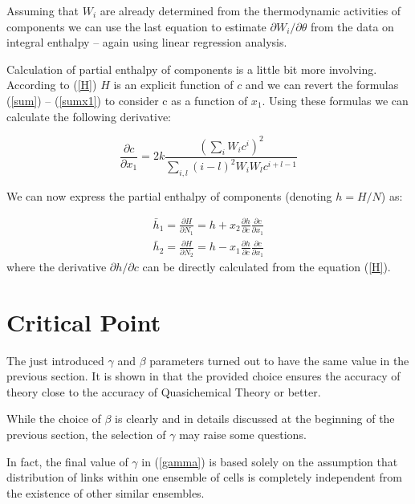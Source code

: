 \documentclass[12pt,abstract]{scrartcl}
\begin{document}
Assuming that $W_i$ are already determined from the thermodynamic activities of components we can use the last equation to estimate $\partial W_i / \partial \theta$ from the data on integral  enthalpy -- again using linear regression analysis.

Calculation of partial  enthalpy of components is a little bit more involving. According to (\ref{H}) $H$ is an explicit function of $c$ and we can revert the formulas (\ref{sum}) --  (\ref{sumx1}) to consider c as a function of $x_1$. Using these formulas we can calculate the following derivative:


\begin{equation} \label{dc2dx1}
    \frac{\partial c}{\partial x_1} = 2 k \frac{
    \left(\sum\limits_i W_i c^i\right)^2}{\sum\limits_{i, l} \left(i-l \right)^2 W_i W_l c^{i+l-1}}
\end{equation}

 We can now express the partial  enthalpy of components (denoting   $h = H / N$) as:

\begin{equation}
\begin{split}
    \bar h_1  =  \frac{\partial H}{\partial N_1} = h + x_2\frac{\partial h}{\partial c} \frac{\partial c}{\partial x_1}\\
    \bar h_2  =  \frac{\partial H}{\partial N_2} = h - x_1\frac{\partial h}{\partial c} \frac{\partial c}{\partial x_1}
\end{split}
\end{equation}
where the derivative $\partial h / \partial c$ can be directly calculated  from the equation (\ref{H}).


\section{Critical Point}

The just introduced $\gamma$ and $\beta$ parameters turned out to have the same value in the previous section. It is shown in \cite{TISR_p2} that  the provided choice ensures the accuracy of theory close to the accuracy of Quasichemical Theory or better.

While the choice of $\beta$ is clearly and in details discussed at the beginning of the previous section, the selection of $\gamma$ may raise  some questions.

In fact, the final value of $\gamma$ in (\ref{gamma}) is based solely on the  assumption that distribution of links within one ensemble of cells  is completely independent from the existence  of other similar ensembles.
\end{document}
